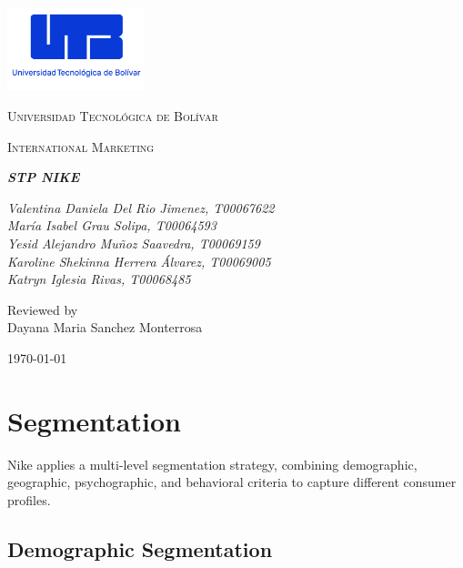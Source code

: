 \documentclass[letterpaper, 12pt]{article}
\begin{document}
\nocite{*}

\begin{titlepage}
    \centering
    \includegraphics[width=0.3\textwidth]{../../../images/logo_utb.png}
    \par\vspace{.2cm}

    {\scshape\LARGE Universidad Tecnológica de Bolívar \par}
    \vspace{0.5cm}

    {\scshape\Large International Marketing \par}
    \vspace{1.0cm}

    \slshape {\Large \bfseries{}STP NIKE\\}
    \vspace{1cm}

    \slshape {\itshape{} Valentina Daniela Del Rio Jimenez, T00067622 \\}
    \slshape {\itshape{} María Isabel Grau Solipa, T00064593 \\}
    \slshape {\itshape{} Yesid Alejandro Muñoz Saavedra, T00069159 \\}
    \slshape {\itshape{} Karoline Shekinna Herrera Álvarez, T00069005 \\}
    \slshape {\itshape{} Katryn Iglesia Rivas, T00068485 \\}
    \vfill

    Reviewed by \\
    Dayana Maria Sanchez Monterrosa\\
    {\large \today\par}
\end{titlepage}

\section{Segmentation}

Nike applies a multi-level segmentation strategy, combining demographic, geographic, psychographic, and behavioral criteria to capture different consumer profiles.

\subsection{Demographic Segmentation}
\end{document}
